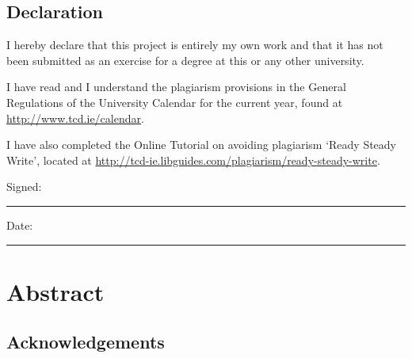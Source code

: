 \documentclass[a4paper,oneside,12pt]{book}
\title{\thesistitle}
\author{\authorname}
\begin{document}



\setlength\paperheight{297mm}
\setlength\paperwidth{210mm}

\setlength{\textheight}{235mm} %
\setlength{\textwidth}{155mm}


\section*{\Huge{Declaration}}
\vspace{1cm}
I hereby declare that this project is entirely my own work and that it has not been submitted as an exercise for a degree at this or any other university.

\vspace{1cm}
I have read and I understand the plagiarism provisions in the General Regulations of the University Calendar for the current year, found at \url{http://www.tcd.ie/calendar}.
\vspace{1cm}

I have also completed the Online Tutorial on avoiding plagiarism `Ready Steady Write', located at
\url{http://tcd-ie.libguides.com/plagiarism/ready-steady-write}.
\vspace{3cm}

Signed:~\rule{5cm}{0.3pt}\hfill Date:~\rule{5cm}{0.3pt}

\chapter*{Abstract}


\newpage
\onehalfspacing\raggedright %

\section*{\Huge{Acknowledgements}}



\tableofcontents
\listoffigures
\listoftables
\newpage


\justify
\mainmatter










\appendix
\renewcommand{\thechapter}{A\arabic{chapter}}

\end{document}
